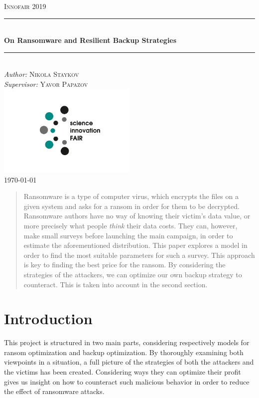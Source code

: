 \documentclass[11pt, a4paper]{article}
\theoremstyle{definition}
\begin{document}
\begin{titlepage}
	\newcommand{\HRule}{\rule{\linewidth}{0.5mm}}
	\centering
	\textsc{\LARGE Innofair 2019}\\[1cm]
	\HRule\\[1 cm]
	{\huge\bfseries On Ransomware and Resilient Backup Strategies}\\[0.5 cm] 
	\HRule\\
			\vfill
			\Large
			\textit{Author:}
			\textsc{Nikola Staykov}\\
            \vspace{2cm}
			\Large
			\textit{Supervisor:}
            \textsc{Yavor Papazov}\\
            \includegraphics[width=0.5\textwidth]{Innofair_logo}\\
    \vfill	
	{\large\today}   
	\vfill
\end{titlepage}

\tableofcontents
\newpage
\begin{abstract}
		Ransomware is a type of computer virus, which encrypts the files on a given system and asks for a ransom in order for them to be decrypted. Ransomware authors have no way of knowing their victim's data value, or more precisely what people \textit{think} their data costs. They can, however, make small surveys before launching the main campaign, in order to estimate the aforementioned distribution. This paper explores a model in order to find the most suitable parameters for such a survey. This approach is key to finding the best price for the ransom. By considering the strategies of the attackers, we can optimize our own backup strategy to counteract. This is taken into account in the second section.
\end{abstract}

\section{Introduction}
	This project is structured in two main parts, considering respectively models for ransom optimization and backup optimization. By thoroughly examining both viewpoints in a situation, a full picture of the strategies of both the attackers and the victims has been created. Considering ways they can optimize their profit gives us insight on how to counteract such malicious behavior in order to reduce the effect of ransomware attacks.
\end{document}
